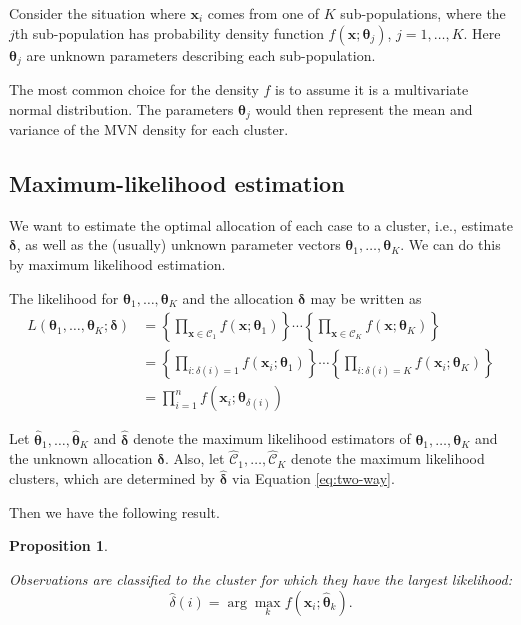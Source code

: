 \documentclass[
]{book}
\newtheorem{proposition}{Proposition}[chapter]
\theoremstyle{definition}
\theoremstyle{definition}
\theoremstyle{definition}
\theoremstyle{definition}
\theoremstyle{remark}
\begin{document}
Consider the situation where \(\mathbf x_i\) comes from one of \(K\) sub-populations, where the \(j\)th sub-population has
probability density function \(f(\mathbf x; \boldsymbol \theta_j)\), \(j=1,\ldots , K\). Here \(\boldsymbol \theta_j\) are unknown parameters describing each sub-population.

The most common choice for the density \(f\) is to assume it is a multivariate normal distribution. The parameters \(\boldsymbol \theta_j\) would then represent the mean and variance of the MVN density for each cluster.

\subsection{Maximum-likelihood estimation}\label{maximum-likelihood-estimation}

We want to estimate the optimal allocation of each case to a cluster, i.e., estimate \(\boldsymbol \delta\), as well as the (usually) unknown parameter vectors \(\boldsymbol \theta_1, \ldots , \boldsymbol \theta_K\). We can do this by maximum likelihood estimation.

The likelihood for \(\boldsymbol \theta_1, \ldots , \boldsymbol \theta_K\) and the allocation \(\boldsymbol \delta\) may be written as
\begin{align*}
L(\boldsymbol \theta_1,\ldots , \boldsymbol \theta_K; \boldsymbol \delta)&=\left \{\prod_{\mathbf x\in \mathcal{C}_1} f(\mathbf x; \boldsymbol \theta_1)\right \}\cdots \left \{\prod_{\mathbf x\in \mathcal{C}_K} f(\mathbf x; \boldsymbol \theta_K)\right \}\\
&=\left \{\prod_{i: \delta(i)=1} f(\mathbf x_i; \boldsymbol \theta_1)\right \}\cdots \left \{\prod_{i: \delta(i)=K} f(\mathbf x_i; \boldsymbol \theta_K)\right \}\\
&= \prod_{i=1}^n f(\mathbf x_i; \boldsymbol \theta_{\delta(i)})
\end{align*}

Let \(\hat{\boldsymbol \theta}_1, \ldots , \hat{\boldsymbol \theta}_K\) and \(\hat{\boldsymbol \delta}\) denote the maximum likelihood estimators of \(\boldsymbol \theta_1, \ldots , \boldsymbol \theta_K\) and the unknown allocation \(\boldsymbol \delta\).
Also, let \(\hat{\mathcal{C}}_1, \ldots, \hat{\mathcal{C}}_K\) denote the maximum likelihood clusters, which are determined by \(\hat{\boldsymbol \delta}\) via Equation \eqref{eq:two-way}.

Then we have the following result.

\begin{proposition}
\protect\hypertarget{prp:ten1}{}\label{prp:ten1}

Observations are classified to the cluster for which they have the largest likelihood:
\[\hat{\delta}(i)= \arg \max_k f(\mathbf x_i; \hat{\boldsymbol \theta}_k).\]

\end{proposition}
\end{document}
